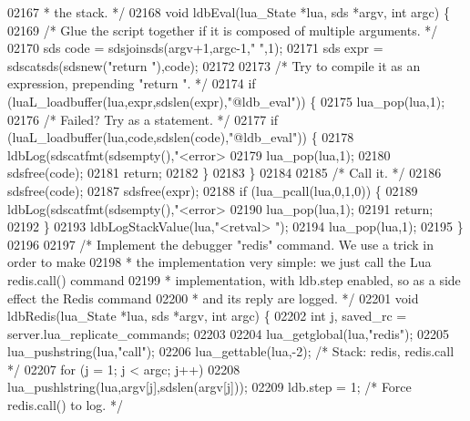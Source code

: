 \begin{DoxyCode}
{{{{{{{{{{{{{{{{{{{{02167 \textcolor{comment}{ * the stack. */}
02168 \textcolor{keywordtype}{void} ldbEval(lua\_State *lua, sds *argv, \textcolor{keywordtype}{int} argc) \{
02169     \textcolor{comment}{/* Glue the script together if it is composed of multiple arguments. */}
02170     sds code = sdsjoinsds(argv+1,argc-1,\textcolor{stringliteral}{" "},1);
02171     sds expr = sdscatsds(sdsnew(\textcolor{stringliteral}{"return "}),code);
02172 
02173     \textcolor{comment}{/* Try to compile it as an expression, prepending "return ". */}
02174     \textcolor{keywordflow}{if} (luaL\_loadbuffer(lua,expr,sdslen(expr),\textcolor{stringliteral}{"@ldb\_eval"})) \{
02175         lua\_pop(lua,1);
02176         \textcolor{comment}{/* Failed? Try as a statement. */}
02177         \textcolor{keywordflow}{if} (luaL\_loadbuffer(lua,code,sdslen(code),\textcolor{stringliteral}{"@ldb\_eval"})) \{
02178             ldbLog(sdscatfmt(sdsempty(),\textcolor{stringliteral}{"<error> %
02179             lua\_pop(lua,1);
02180             sdsfree(code);
02181             \textcolor{keywordflow}{return};
02182         \}
02183     \}
02184 
02185     \textcolor{comment}{/* Call it. */}
02186     sdsfree(code);
02187     sdsfree(expr);
02188     \textcolor{keywordflow}{if} (lua\_pcall(lua,0,1,0)) \{
02189         ldbLog(sdscatfmt(sdsempty(),\textcolor{stringliteral}{"<error> %
02190         lua\_pop(lua,1);
02191         \textcolor{keywordflow}{return};
02192     \}
02193     ldbLogStackValue(lua,\textcolor{stringliteral}{"<retval> "});
02194     lua\_pop(lua,1);
02195 \}
02196 
02197 \textcolor{comment}{/* Implement the debugger "redis" command. We use a trick in order to make}
02198 \textcolor{comment}{ * the implementation very simple: we just call the Lua redis.call() command}
02199 \textcolor{comment}{ * implementation, with ldb.step enabled, so as a side effect the Redis command}
02200 \textcolor{comment}{ * and its reply are logged. */}
02201 \textcolor{keywordtype}{void} ldbRedis(lua\_State *lua, sds *argv, \textcolor{keywordtype}{int} argc) \{
02202     \textcolor{keywordtype}{int} j, saved\_rc = server.lua\_replicate\_commands;
02203 
02204     lua\_getglobal(lua,\textcolor{stringliteral}{"redis"});
02205     lua\_pushstring(lua,\textcolor{stringliteral}{"call"});
02206     lua\_gettable(lua,-2);       \textcolor{comment}{/* Stack: redis, redis.call */}
02207     \textcolor{keywordflow}{for} (j = 1; j < argc; j++)
02208         lua\_pushlstring(lua,argv[j],sdslen(argv[j]));
02209     ldb.step = 1;               \textcolor{comment}{/* Force redis.call() to log. */}
}}}}}}}}}}}}}}}}}}}}}}
\end{DoxyCode}
